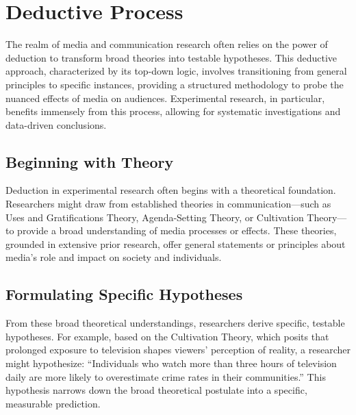 \documentclass[
  b5paper]{book}
\begin{document}
\hypertarget{deductive-process}{%
\section{Deductive Process}\label{deductive-process}}

The realm of media and communication research often relies on the power of deduction to transform broad theories into testable hypotheses. This deductive approach, characterized by its top-down logic, involves transitioning from general principles to specific instances, providing a structured methodology to probe the nuanced effects of media on audiences. Experimental research, in particular, benefits immensely from this process, allowing for systematic investigations and data-driven conclusions.

\hypertarget{beginning-with-theory}{%
\subsection*{Beginning with Theory}\label{beginning-with-theory}}

Deduction in experimental research often begins with a theoretical foundation. Researchers might draw from established theories in communication---such as Uses and Gratifications Theory, Agenda-Setting Theory, or Cultivation Theory---to provide a broad understanding of media processes or effects. These theories, grounded in extensive prior research, offer general statements or principles about media's role and impact on society and individuals.

\hypertarget{formulating-specific-hypotheses}{%
\subsection*{Formulating Specific Hypotheses}\label{formulating-specific-hypotheses}}

From these broad theoretical understandings, researchers derive specific, testable hypotheses. For example, based on the Cultivation Theory, which posits that prolonged exposure to television shapes viewers' perception of reality, a researcher might hypothesize: ``Individuals who watch more than three hours of television daily are more likely to overestimate crime rates in their communities.'' This hypothesis narrows down the broad theoretical postulate into a specific, measurable prediction.
\end{document}
